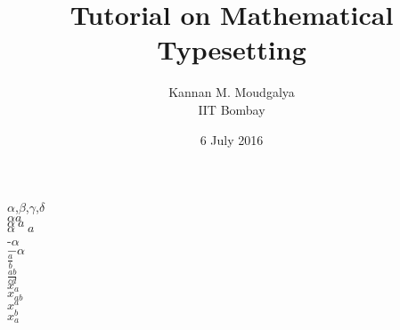 \documentclass[12pt,a5paper]{article}
\title{Tutorial on Mathematical Typesetting}
\author{Kannan M. Moudgalya \\ IIT Bombay}
\date{6 July 2016}
\begin{document}
\maketitle

$\alpha$,$\beta$,$\gamma$,$\delta$ \\

$\alpha a$ \\
$\alpha \ a$ \\
$\alpha \quad a$  \\

-$\alpha$ \\
$-\alpha$  \\

$\frac a b$ \\
$\frac{ab}{cd}$ \\

$x_a$ \\
$x_{ab}$ \\
$x^a$ \\
$x_a^b$ \\  
\end{document}
